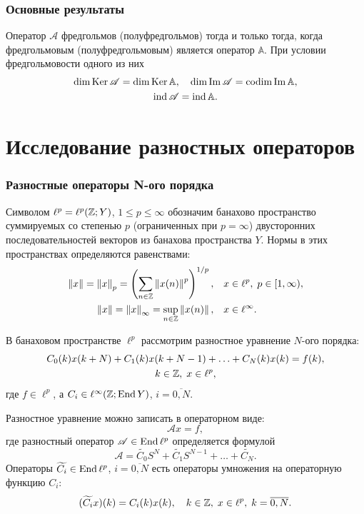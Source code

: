 \documentclass{beamer}
\begin{document}
\begin{frame}
\frametitle{Основные результаты}

\begin{theorem}\label{th:inverse}
    Оператор $\mathcal A$ фредгольмов (полуфредгольмов) тогда и только тогда, когда фредгольмовым (полуфредгольмовым) является оператор $\mathbb A$. При условии фредгольмовости одного из них
    \begin{gather*}
    \dim \operatorname{Ker} \mathcal A = \dim \operatorname{Ker} \mathbb A, \quad \dim \operatorname{Im} \mathcal A = \operatorname{codim} \operatorname{Im} \mathbb A, \\
    \operatorname{ind} \mathcal A = \operatorname{ind} \mathbb A.
    \end{gather*}
\end{theorem}

\end{frame}

\section{Исследование разностных операторов}

\begin{frame}
\frametitle{Разностные операторы N-ого порядка}

Символом $\ell^p = \ell^p(\mathbb{Z}; Y)$, $1 \leq p \leq \infty$ обозначим банахово пространство суммируемых со степенью $p$ (ограниченных при $p = \infty$) двусторонних последовательностей векторов из банахова пространства $Y$. Нормы в этих пространствах определяются равенствами:
\begin{align*}
    \left\|x\right\| = \left\|x\right\|_p = \left(\sum_{n \in \mathbb{Z}} \left\|x(n)\right\|^p\right)^{1/p}, \quad &x \in \ell^p, \; p \in [1, \infty), \\
    \left\|x\right\| = \left\|x\right\|_\infty = \sup_{n\in \mathbb{Z}} \left\|x(n)\right\|, \quad &x \in \ell^\infty.
\end{align*}
\end{frame}

\begin{frame}
В банаховом пространстве $\ell^p$ рассмотрим разностное уравнение $N$-ого порядка:
\begin{gather*}
C_0(k) x(k + N) + C_1(k) x(k + N - 1) + \dotsc + C_{N}(k) x(k) = f(k), \\
k \in \mathbb{Z}, \; x \in \ell^p,
\end{gather*}
где $f \in \ell^p$, а $C_i \in \ell^\infty(\mathbb{Z}; \operatorname{End} Y)$, $i = \overline{0,N}$.
\end{frame}


\begin{frame}
Разностное уравнение можно записать в операторном виде:
\[  \mathcal A x = f, \]
где разностный оператор $ \mathcal A \in \operatorname{End} \ell^p$ определяется формулой
\begin{equation*}
\mathcal A = \widetilde{C_0} S^N + \widetilde{C_1} S^{N - 1} + \dotsc + \widetilde{C_N}.
\end{equation*}
Операторы $\widetilde{C_i} \in \operatorname{End} \ell^p$, $i = \overline{0,N}$ есть операторы умножения на операторную функцию $C_i$:
\[ (\widetilde{C_i}x)(k) = C_i(k)x(k), \quad k \in \mathbb{Z}, \; x \in \ell^p, \; k = \overline{0,N}. \]
\end{frame}
\end{document}
